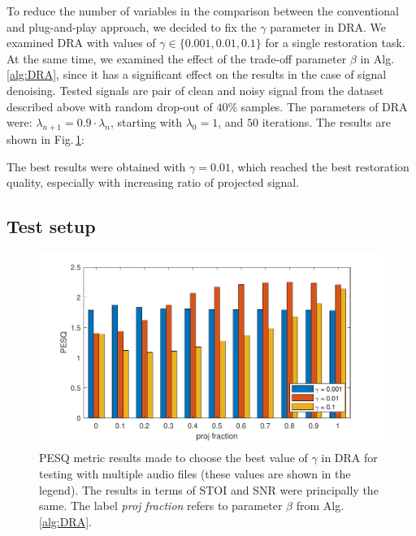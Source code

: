 \documentclass[conference]{IEEEtran}
\begin{document}
To reduce the number of variables in the comparison between the conventional and plug-and-play approach, we decided to fix the $\gamma$ parameter in DRA.
We examined DRA with values of $\gamma\in\{0.001, 0.01,0.1\}$ for a single restoration task.
At the same time, we examined the effect of the trade-off parameter $\beta$ in Alg.\,\ref{alg:DRA}, since it has a significant effect on the results in the case of signal denoising. 
Tested signals are pair of clean and noisy signal from the dataset described above with random drop-out of $40\%$ samples.
The parameters of DRA were: $\lambda_{n+1}=0.9\cdot\lambda_{n}$, starting with $\lambda_0=1$, and $50$ iterations. 
The results are shown in Fig.\,\ref{fig:gammatest}:

The best results were obtained with $\gamma=0.01$, which reached the best restoration quality, especially with increasing ratio of projected signal.

\subsection{Test setup}


\begin{figure}[h]
	\includegraphics[width=1\linewidth]{figures/gamma_test}
	\caption{PESQ metric results made to choose the best value of $\gamma$ in DRA for testing with multiple audio files (these values are shown in the legend). 
		The results in terms of STOI and SNR were principally the same.
		The label \textit{proj fraction} refers to parameter $\beta$ from Alg.\,\ref{alg:DRA}.}
	\label{fig:gammatest}
	\vspace{-1em}
\end{figure}
\end{document}
